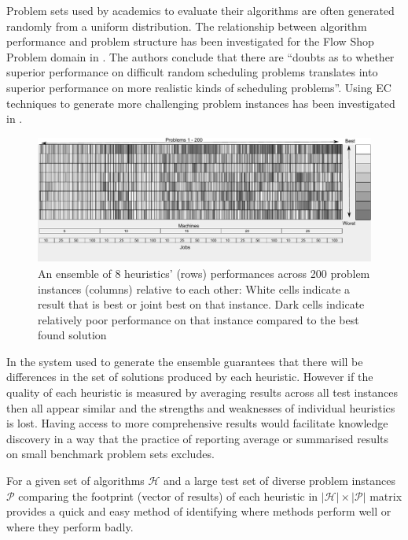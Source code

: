 \documentclass[a4paper]{article}
\begin{document}
Problem sets used by academics to evaluate their algorithms are often generated randomly from a uniform distribution. The relationship between algorithm performance and problem structure has been investigated for the Flow Shop Problem domain in \cite{Watson2002}. The authors conclude that there are ``doubts as to whether superior performance on difficult random scheduling problems translates into superior performance on more realistic kinds of scheduling problems''.
Using EC techniques to generate more challenging problem instances has been investigated in  \cite{vanHemert2006,Smith-Miles2010,SmithMiles2015b}. 


\begin{figure}
\centering
\includegraphics[width=1.0\textwidth]{img/8HProfileRanked}
\caption{\label{img:rank}  An ensemble of 8 heuristics' (rows) performances across 200 problem instances (columns) relative to each other: White cells indicate a result that is best or joint best on that instance. Dark cells indicate relatively poor performance on that instance compared to the best found solution}
\end{figure} 

 In \cite{Hart2015underReview} the system used to generate the ensemble guarantees that there will be differences in the set of solutions produced by each heuristic. However if the quality of each heuristic is measured by averaging results across all test instances then all appear similar and the strengths and weaknesses of individual heuristics is lost. Having access to more comprehensive results would facilitate knowledge discovery in a way that the practice of reporting average or summarised results on small benchmark problem sets excludes. 

For a given set of algorithms $\mathcal{H}$ and a large test set of diverse problem instances $\mathcal{P}$ comparing the footprint (vector of results) of each heuristic in  $|\mathcal{H}|  \times |\mathcal{P}|$ matrix provides a quick and easy method of identifying where methods perform well or where they perform badly.
\end{document}
